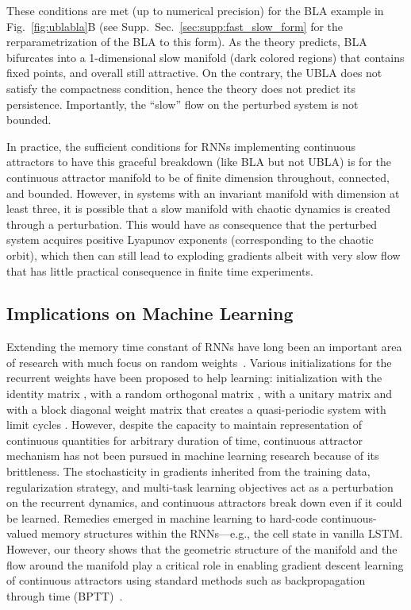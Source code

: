 \documentclass{article} %
\newcounter{ct}
\theoremstyle{definition}
\theoremstyle{remark}
\renewcommand{\cite}{\citep}
\begin{document}
These conditions are met (up to numerical precision) for the BLA example in Fig.~\ref{fig:ublabla}B (see Supp.~Sec.~\ref{sec:supp:fast_slow_form} for the rerparametrization of the BLA to this form).
As the theory predicts, BLA bifurcates into a 1-dimensional slow manifold (dark colored regions) that contains fixed points, and overall still attractive.
On the contrary, the UBLA does not satisfy the compactness condition, hence the theory does not predict its persistence.
Importantly, the ``slow'' flow on the perturbed system is not bounded.


In practice, the sufficient conditions for RNNs implementing continuous attractors to have this graceful breakdown (like BLA but not UBLA) is for the continuous attractor manifold to be of finite dimension throughout, connected, and bounded.
However, in systems with an invariant manifold with dimension at least three, it is possible that a slow manifold with chaotic dynamics is created through a perturbation. This would have as consequence that the perturbed system acquires positive Lyapunov exponents (corresponding to the chaotic orbit), which then can still lead to exploding gradients albeit with very slow flow that has little practical consequence in finite time experiments.

\subsection{Implications on Machine Learning}\label{sec:imp:ML}
Extending the memory time constant of RNNs have long been an important area of research with much focus on random weights~\cite{Legenstein2007,Goldman2009,Toyoizumi2011,Kerg2019,Chen2018,Henaff2016,Rusch2021,arjovsky2016}.
Various initializations for the recurrent weights have been proposed to help learning: initialization with the identity matrix \citep{le2015}, with a random orthogonal matrix \citep{saxe2014,Henaff2016}, with a unitary matrix \citep{arjovsky2016} and with a block diagonal weight matrix that creates a quasi-periodic system with limit cycles \citep{Sokol2019a}.
However, despite the capacity to maintain representation of continuous quantities for arbitrary duration of time, continuous attractor mechanism has not been pursued in machine learning research because of its brittleness.
The stochasticity in gradients inherited from the training data, regularization strategy, and multi-task learning objectives act as a perturbation on the recurrent dynamics, and continuous attractors break down even if it could be learned.
Remedies emerged in machine learning to hard-code continuous-valued memory structures within the RNNs---e.g., the cell state in vanilla LSTM.
However, our theory shows that the geometric structure of the manifold and the flow around the manifold play a critical role in enabling gradient descent learning of continuous attractors using standard methods such as backpropagation through time (BPTT)~\cite{Toomarian1991}.
\end{document}

